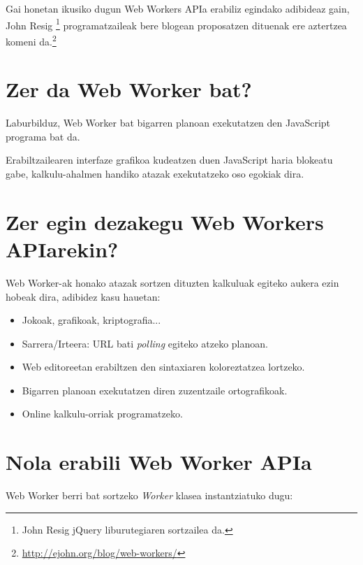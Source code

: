 Gai honetan ikusiko dugun Web Workers APIa erabiliz egindako adibideaz gain, John Resig \footnote{John Resig jQuery liburutegiaren sortzailea da. } programatzaileak bere blogean proposatzen dituenak ere aztertzea komeni da.\footnote{\href{http://ejohn.org/blog/web-workers/}{http://ejohn.org/blog/web-workers/}}

\section{Zer da Web Worker bat?}

Laburbilduz, Web Worker bat bigarren planoan exekutatzen den JavaScript programa bat da.

Erabiltzailearen interfaze grafikoa kudeatzen duen JavaScript haria blokeatu gabe, kalkulu-ahalmen handiko atazak exekutatzeko oso egokiak dira.

\section{Zer egin dezakegu Web Workers APIarekin?}

Web Worker-ak honako atazak sortzen dituzten kalkuluak egiteko aukera ezin hobeak dira, adibidez kasu hauetan: 
\begin{itemize}
    \item Jokoak, grafikoak, kriptografia...
    \item Sarrera/Irteera: URL bati \textit{polling} egiteko atzeko planoan.
    \item Web editoreetan erabiltzen den sintaxiaren koloreztatzea lortzeko.
    \item Bigarren planoan exekutatzen diren zuzentzaile ortografikoak.
    \item Online kalkulu-orriak  programatzeko.
\end{itemize}


\section{Nola erabili Web Worker APIa}

Web Worker berri bat sortzeko \textit{Worker} klasea instantziatuko dugu:


